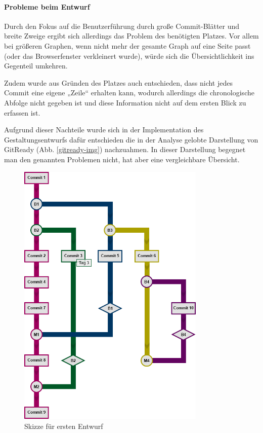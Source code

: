 \documentclass[color, ddc]{tudscrreprt}
\begin{document}
\paragraph{Probleme beim Entwurf}

Durch den Fokus auf die Benutzerführung durch große Commit-Blätter und breite Zweige ergibt sich allerdings das Problem des benötigten Platzes. Vor allem bei größeren Graphen, wenn nicht mehr der gesamte Graph auf eine Seite passt (oder das Browserfenster verkleinert wurde), würde sich die Übersichtlichkeit ins Gegenteil umkehren.

Zudem wurde aus Gründen des Platzes auch entschieden, dass nicht jedes Commit eine eigene „Zeile“ erhalten kann, wodurch allerdings die chronologische Abfolge nicht gegeben ist und diese Information nicht auf dem ersten Blick zu erfassen ist.

Aufgrund dieser Nachteile wurde sich in der Implementation des Gestaltungsentwurfs dafür entschieden die in der Analyse gelobte Darstellung von GitReady (Abb. \ref{gitready-img}) nachzuahmen. In dieser Darstellung begegnet man den genannten Problemen nicht, hat aber eine vergleichbare Übersicht.


\begin{figure}[ht!]
\centering
\includegraphics[width=0.8\textwidth]{Skizzen/2015-01 VisualisierungsSkizze-rev.png}
\caption{Skizze für ersten Entwurf}
\label{entwurf-img}
\end{figure}
\end{document}
